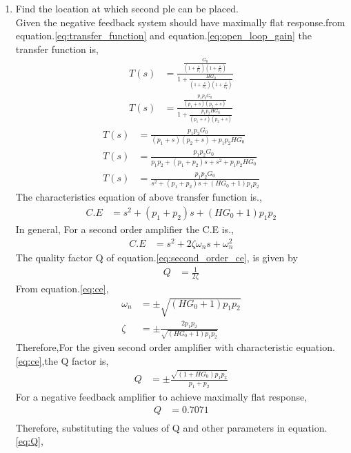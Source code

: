 \begin{enumerate}[label=\thesubsection.\arabic*.,ref=\thesubsection.\theenumi]
\item Find the location at which second ple can be placed.\\
\solution Given the negative feedback system should have maximally flat response.from equation.\ref{eq:transfer_function} and equation.\ref{eq:open_loop_gain} the transfer function is,
\begin{align}
    T(s) &= \frac{\frac{G_0}{(1+\frac{s}{p_{1}})(1+\frac{s}{p_{2}})}}{1+\frac{HG_0}{(1+\frac{s}{p_{1}})(1+\frac{s}{p_{2}})}}\\
    T(s) &= \frac{\frac{p_1p_2G_0}{(p_1+s)(p_2+s)}}{1+\frac{p_1p_2HG_0}{(p_1+s)(p_2+s)}}
\end{align}
\begin{align}
    T(s) &= \frac{p_1p_2G_0}{(p_1+s)(p_2+s) + p_1p_2HG_0}\\
    T(s) &= \frac{p_1p_2G_0}{p_1p_2+(p_1+p_2)s+s^2 + p_1p_2HG_0}\\
    T(s) &= \frac{p_1p_2G_0}{s^2+(p_1+p_2)s+(HG_0+1)p_1p_2} \label{eq:closed_loop}
\end{align}
The characteristics equation of above transfer function is.,
\begin{align}
    C.E &= s^2+(p_1+p_2)s+(HG_0+1)p_1p_2 \label{eq:ce}
\end{align}
In general, For a second order amplifier the C.E is.,
\begin{align}
    C.E &= s^2+2\zeta\omega_ns+\omega_n^{2} \label{eq:second_order_ce}
\end{align}
The quality factor Q of equation.\ref{eq:second_order_ce}, is given by
\begin{align}
    Q &= \frac{1}{2\zeta}
\end{align}
From equation.\ref{eq:ce},
\begin{align}
    \omega_n &= \pm{\sqrt{(HG_0+1)p_1p_2}}\\
    \zeta &= \pm{\frac{2p_1p_2}{\sqrt{(HG_0+1)p_1p_2}}}
\end{align}
Therefore,For the given second order amplifier with characteristic equation.\ref{eq:ce},the Q factor is,
\begin{align}
    Q &= \pm{\frac{\sqrt{(1+HG_0)p_1p_2}}{p_1+p_2}} \label{eq:Q}
\end{align}
For a negative feedback amplifier to achieve maximally flat response,
\begin{align}
    Q &= 0.7071\\
\end{align}
Therefore, substituting the values of Q and other parameters in equation.\ref{eq:Q},

\end{enumerate}
